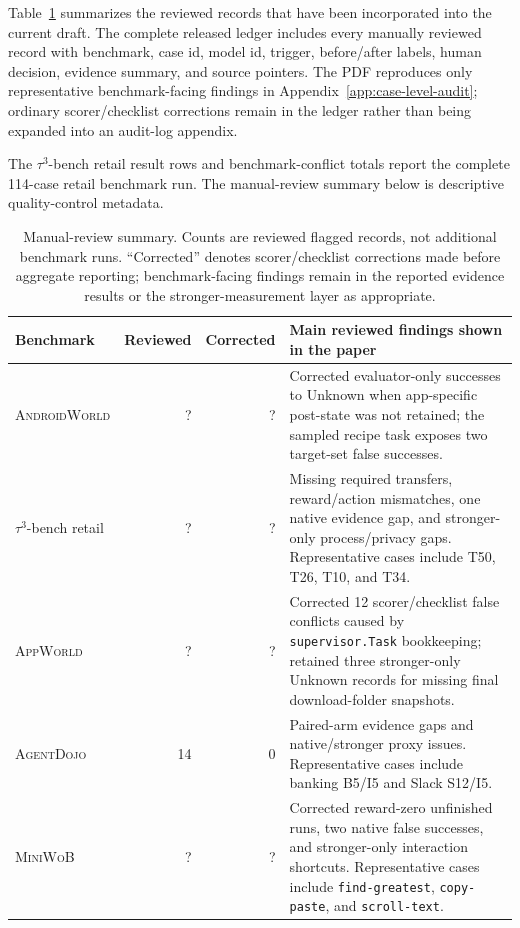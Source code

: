 \documentclass{article}
\newcommand{\agentdojo}{\textsc{AgentDojo}\xspace}
\newcommand{\appworld}{\textsc{AppWorld}\xspace}
\newcommand{\tauthree}{\(\tau^3\)-bench retail\xspace}
\newcommand{\androidworld}{\textsc{AndroidWorld}\xspace}
\newcommand{\miniwob}{\textsc{MiniWoB}\xspace}
\newcommand{\fillfromdata}{\textsc{\color{red}?}}
\newcommand{\paperupdate}[1]{\textcolor{revisionblue}{#1}}
\providecommand{\AWDAuditReviewed}{\fillfromdata}
\providecommand{\AWDAuditCorrections}{\fillfromdata}
\providecommand{\APPAuditReviewed}{\fillfromdata}
\providecommand{\APPAuditCorrections}{\fillfromdata}
\providecommand{\MWBAuditReviewed}{\fillfromdata}
\providecommand{\MWBAuditCorrections}{\fillfromdata}
\providecommand{\TAUAuditReviewed}{\fillfromdata}
\providecommand{\TAUAuditCorrections}{\fillfromdata}
\begin{document}
Table~\ref{tab:manual-review-summary} summarizes the reviewed records that have
been incorporated into the current draft. The complete released ledger includes
every manually reviewed record with benchmark, case id, model id, trigger,
before/after labels, human decision, evidence summary, and source pointers. The
PDF reproduces only representative benchmark-facing findings in
Appendix~\ref{app:case-level-audit}; ordinary scorer/checklist corrections
remain in the ledger rather than being expanded into an audit-log appendix.

\paperupdate{The \tauthree result rows and benchmark-conflict totals report the
complete 114-case retail benchmark run. The manual-review summary below is
descriptive quality-control metadata.}

\begin{table}[h]
\centering
\caption{Manual-review summary. Counts are reviewed flagged records, not
additional benchmark runs. ``Corrected'' denotes scorer/checklist corrections
made before aggregate reporting; benchmark-facing findings remain in the
reported evidence results or the stronger-measurement layer as appropriate.}
\label{tab:manual-review-summary}
\footnotesize
\setlength{\tabcolsep}{3pt}
\renewcommand{\arraystretch}{1.12}
\begin{tabularx}{\linewidth}{@{}l r r X@{}}
\toprule
Benchmark & Reviewed & Corrected & Main reviewed findings shown in the paper \\
\midrule
\androidworld & \AWDAuditReviewed & \AWDAuditCorrections & Corrected evaluator-only successes to Unknown when app-specific post-state was not retained; the sampled recipe task exposes two target-set false successes. \\
\tauthree & \TAUAuditReviewed & \TAUAuditCorrections & Missing required transfers, reward/action mismatches, one native evidence gap, and stronger-only process/privacy gaps. Representative cases include T50, T26, T10, and T34. \\
\appworld & \APPAuditReviewed & \APPAuditCorrections & Corrected 12 scorer/checklist false conflicts caused by \texttt{supervisor.Task} bookkeeping; retained three stronger-only Unknown records for missing final download-folder snapshots. \\
\agentdojo & 14 & 0 & Paired-arm evidence gaps and native/stronger proxy issues. Representative cases include banking B5/I5 and Slack S12/I5. \\
\miniwob & \MWBAuditReviewed & \MWBAuditCorrections & Corrected reward-zero unfinished runs, two native false successes, and stronger-only interaction shortcuts. Representative cases include \texttt{find-greatest}, \texttt{copy-paste}, and \texttt{scroll-text}. \\
\bottomrule
\end{tabularx}
\end{table}
\end{document}
